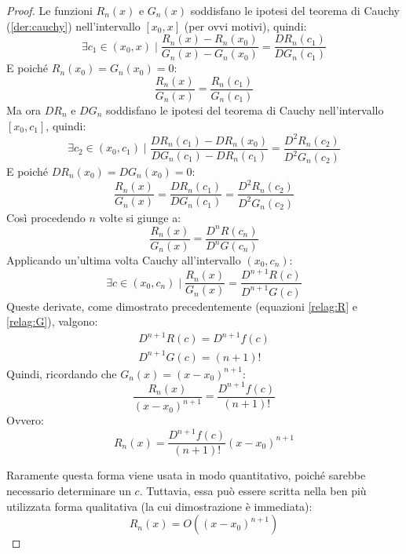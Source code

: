 \begin{proof}
	Le funzioni $R_n(x)$ e $G_n(x)$ soddisfano le ipotesi del teorema di Cauchy (\ref{der:cauchy}) nell'intervallo $[x_0,x]$ (per ovvi motivi), quindi:
	\[
		\exists c_1\in(x_0,x)\mid\frac{R_n(x)-R_n(x_0)}{G_n(x)-G_n(x_0)}=\frac{DR_n(c_1)}{DG_n(c_1)}
	\]
	E poiché $R_n(x_0)=G_n(x_0)=0$:
	\[
		\frac{R_n(x)}{G_n(x)}=\frac{R_n(c_1)}{G_n(c_1)}
	\]
	Ma ora $DR_n$ e $DG_n$ soddisfano le ipotesi del teorema di Cauchy nell'intervallo $[x_0,c_1]$, quindi:
	\[
		\exists c_2\in(x_0,c_1)\mid\frac{DR_n(c_1)-DR_n(x_0)}{DG_n(c_1)-DR_n(c_1)}=\frac{D^2R_n(c_2)}{D^2G_n(c_2)}
	\]
	E poiché $DR_n(x_0)=DG_n(x_0)=0$:
	\[
		\frac{R_n(x)}{G_n(x)}=\frac{DR_n(c_1)}{DG_n(c_1)}=\frac{D^2R_n(c_2)}{D^2G_n(c_2)}
	\]
	Così procedendo $n$ volte si giunge a:
	\[
		\frac{R_n(x)}{G_n(x)}=\frac{D^nR(c_n)}{D^nG(c_n)}
	\]
	Applicando un'ultima volta Cauchy all'intervallo $(x_0,c_n)$:
	\[
		\exists c\in(x_0,c_n)\mid\frac{R_n(x)}{G_n(x)}=\frac{D^{n+1}R(c)}{D^{n+1}G(c)}
	\]
	Queste derivate, come dimostrato precedentemente (equazioni \ref{relag:R} e \ref{relag:G}), valgono:
	\begin{gather*}
		D^{n+1}R(c)=D^{n+1}f(c)\\
		D^{n+1}G(c)=(n+1)!
	\end{gather*}
	Quindi, ricordando che $G_n(x)=(x-x_0)^{n+1}$:
	\[
		\frac{R_n(x)}{(x-x_0)^{n+1}}=\frac{D^{n+1}f(c)}{(n+1)!}
	\]
	Ovvero:
	\[
		R_n(x)=\frac{D^{n+1}f(c)}{(n+1)!}(x-x_0)^{n+1}
	\]

	Raramente questa forma viene usata in modo quantitativo, poiché sarebbe necessario determinare un $c$. Tuttavia, essa può essere scritta nella ben più utilizzata forma qualitativa (la cui dimostrazione è immediata):
	\[
		R_n(x)=O((x-x_0)^{n+1})
	\]
\end{proof}


